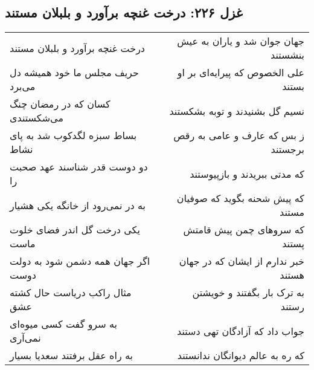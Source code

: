 \begin{center}
\section*{غزل ۲۲۶: درخت غنچه برآورد و بلبلان مستند}
\label{sec:226}
\begin{longtable}{l p{0.5cm} r}
درخت غنچه برآورد و بلبلان مستند
&&
جهان جوان شد و یاران به عیش بنشستند
\\
حریف مجلس ما خود همیشه دل می‌برد
&&
علی الخصوص که پیرایه‌ای بر او بستند
\\
کسان که در رمضان چنگ می‌شکستندی
&&
نسیم گل بشنیدند و توبه بشکستند
\\
بساط سبزه لگدکوب شد به پای نشاط
&&
ز بس که عارف و عامی به رقص برجستند
\\
دو دوست قدر شناسند عهد صحبت را
&&
که مدتی ببریدند و بازپیوستند
\\
به در نمی‌رود از خانگه یکی هشیار
&&
که پیش شحنه بگوید که صوفیان مستند
\\
یکی درخت گل اندر فضای خلوت ماست
&&
که سروهای چمن پیش قامتش پستند
\\
اگر جهان همه دشمن شود به دولت دوست
&&
خبر ندارم از ایشان که در جهان هستند
\\
مثال راکب دریاست حال کشته عشق
&&
به ترک بار بگفتند و خویشتن رستند
\\
به سرو گفت کسی میوه‌ای نمی‌آری
&&
جواب داد که آزادگان تهی دستند
\\
به راه عقل برفتند سعدیا بسیار
&&
که ره به عالم دیوانگان ندانستند
\\
\end{longtable}
\end{center}
